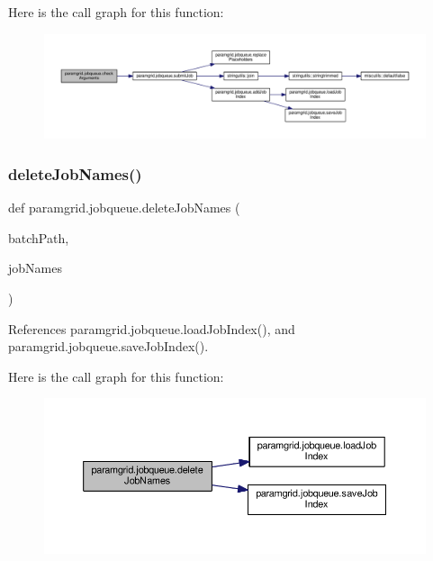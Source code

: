 Here is the call graph for this function\+:
\nopagebreak
\begin{figure}[H]
\begin{center}
\leavevmode
\includegraphics[width=350pt]{namespaceparamgrid_1_1jobqueue_a8887b30e1e0ae144c205ce0bdbb10f70_cgraph}
\end{center}
\end{figure}
\mbox{\label{namespaceparamgrid_1_1jobqueue_a54698014c1d21493336e894bc3d8d7ed}} 
\subsubsection{\texorpdfstring{delete\+Job\+Names()}{deleteJobNames()}}
{\footnotesize\ttfamily def paramgrid.\+jobqueue.\+delete\+Job\+Names (\begin{DoxyParamCaption}\item[{}]{batch\+Path,  }\item[{}]{job\+Names }\end{DoxyParamCaption})}



References paramgrid.\+jobqueue.\+load\+Job\+Index(), and paramgrid.\+jobqueue.\+save\+Job\+Index().

Here is the call graph for this function\+:
\nopagebreak
\begin{figure}[H]
\begin{center}
\leavevmode
\includegraphics[width=350pt]{namespaceparamgrid_1_1jobqueue_a54698014c1d21493336e894bc3d8d7ed_cgraph}
\end{center}
\end{figure}
\mbox{\label{namespaceparamgrid_1_1jobqueue_a6fbbd25249531a7a6197d5ffe37d164e}} 
